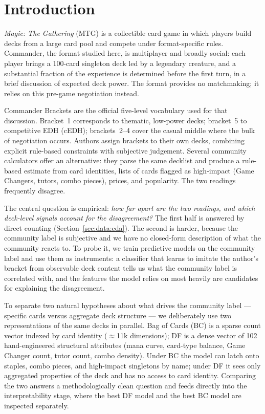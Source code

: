 \documentclass{article}
\begin{document}
\section{Introduction}
\label{sec:intro}

\textit{Magic: The Gathering} (MTG) is a collectible card game in which players build decks from a large card pool and compete under format-specific rules. Commander, the format studied here, is multiplayer and broadly social: each player brings a 100-card singleton deck led by a legendary creature, and a substantial fraction of the experience is determined before the first turn, in a brief discussion of expected deck power. The format provides no matchmaking; it relies on this pre-game negotiation instead.

Commander Brackets are the official five-level vocabulary used for that discussion. Bracket~1 corresponds to thematic, low-power decks; bracket~5 to competitive EDH (cEDH); brackets~2--4 cover the casual middle where the bulk of negotiation occurs. Authors assign brackets to their own decks, combining explicit rule-based constraints with subjective judgement. Several community calculators offer an alternative: they parse the same decklist and produce a rule-based estimate from card identities, lists of cards flagged as high-impact (Game Changers, tutors, combo pieces), prices, and popularity. The two readings frequently disagree.

The central question is empirical: \textit{how far apart are the two readings, and which deck-level signals account for the disagreement?} The first half is answered by direct counting (Section~\ref{sec:data:eda}). The second is harder, because the community label is subjective and we have no closed-form description of what the community reacts to. To probe it, we train predictive models on the community label and use them as instruments: a classifier that learns to imitate the author's bracket from observable deck content tells us what the community label is correlated with, and the features the model relies on most heavily are candidates for explaining the disagreement.

To separate two natural hypotheses about what drives the community label --- specific cards versus aggregate deck structure --- we deliberately use two representations of the same decks in parallel. Bag of Cards (BC) is a sparse count vector indexed by card identity (\(\approx\)11k dimensions); DF is a dense vector of 102 hand-engineered structural attributes (mana curve, card-type balance, Game Changer count, tutor count, combo density). Under BC the model can latch onto staples, combo pieces, and high-impact singletons by name; under DF it sees only aggregated properties of the deck and has no access to card identity. Comparing the two answers a methodologically clean question and feeds directly into the interpretability stage, where the best DF model and the best BC model are inspected separately.
\end{document}
